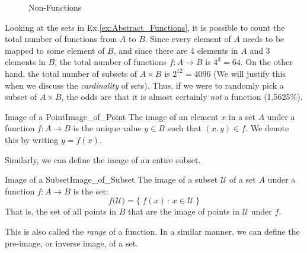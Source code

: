         \begin{figure}[H]
            \centering
            \begin{subfigure}[b]{0.49\textwidth}
                \centering
                \resizebox{\textwidth}{!}{%
                    
                }
            \end{subfigure}
            \begin{subfigure}[b]{0.49\textwidth}
                \centering
                \resizebox{\textwidth}{!}{%
                    
                }
            \end{subfigure}
            \caption{Non-Functions}
            \label{fig:Abstract_Non_Functions}
        \end{figure}
        Looking at the sets in Ex.\ref{ex:Abstract_Functions}, it is possible
        to count the total number of functions from $A$ to $B$. Since every
        element of $A$ needs to be mapped to some element of $B$, and since
        there are 4 elements in $A$ and 3 elements in $B$, the total number of
        functions $f:A\rightarrow{B}$ is $4^{3}=64$. On the other hand, the
        total number of subsets of $A\times{B}$ is $2^{12}=4096$
        (We will justify this when we discuss the \textit{cardinality} of
        sets). Thus, if we were to randomly pick a subset of $A\times{B}$, the
        odds are that it is almost certainly \textit{not} a function
        (1.5625\%).
        \begin{ldefinition}{Image of a Point}{Image_of_Point}
            The image of an element $x$ in a set $A$ under a
            function $f:A\rightarrow{B}$ is the unique value
            $y\in{B}$ such that $(x,y)\in{f}$. We denote this
            by writing $y=f(x)$.
        \end{ldefinition}
        Similarly, we can define the image of an entire subset.
        \begin{ldefinition}{Image of a Subset}{Image_of_Subset}
            The image of a subset $\mathcal{U}$ of a set $A$
            under a function $f:A\rightarrow{B}$ is the set:
            \begin{equation}
                f\big(\mathcal{U}\big)=
                    \{\;f(x)\,:\,x\in\mathcal{U}\;\}
            \end{equation}
            That is, the set of all points in $B$ that are the
            image of points in $\mathcal{U}$ under $f$.
        \end{ldefinition}
        This is also called the \textit{range} of a function.
        In a similar manner, we can define the pre-image, or
        inverse image, of a set.

